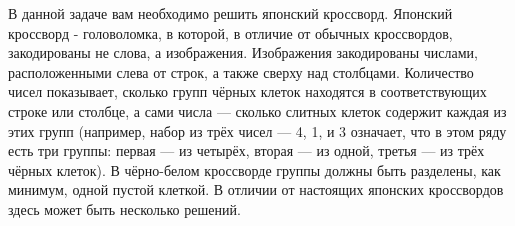 В данной задаче вам необходимо решить японский кроссворд. Японский кроссворд - головоломка, в которой, в отличие от обычных кроссвордов, закодированы не слова, а изображения. Изображения закодированы числами, расположенными слева от строк, а также сверху над столбцами. Количество чисел показывает, сколько групп чёрных клеток находятся в соответствующих строке или столбце, а сами числа --- сколько слитных клеток содержит каждая из этих групп (например, набор из трёх чисел --- 4, 1, и 3 означает, что в этом ряду есть три группы: первая --- из четырёх, вторая --- из одной, третья --- из трёх чёрных клеток). В чёрно-белом кроссворде группы должны быть разделены, как минимум, одной пустой клеткой. В отличии от настоящих японских кроссвордов здесь может быть несколько решений.